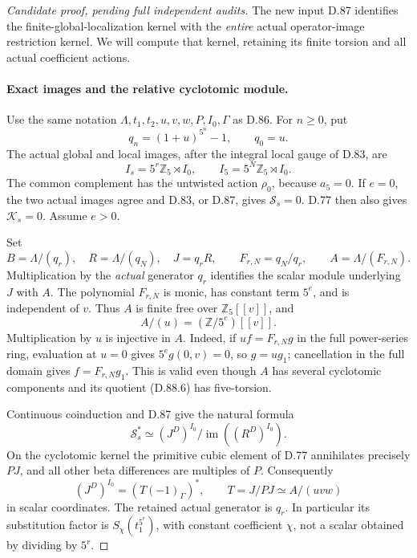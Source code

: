 \begin{proof}[Candidate proof, pending full independent audits]
The new input D.87 identifies the finite-global-localization
kernel with the \emph{entire} actual operator-image restriction
kernel. We will compute that kernel, retaining its finite
torsion and all actual coefficient actions.

\paragraph{Exact images and the relative cyclotomic module.}
Use the same notation \(\Lambda,t_1,t_2,u,v,w,P,I_0,\Gamma\)
as D.86. For \(n\ge0\), put
\[
                     q_n=(1+u)^{5^n}-1,
                     \qquad q_0=u.
\]
The actual global and local images, after the integral local
gauge of D.83, are
\[
 I_s=5^r\mathbb Z_5\rtimes I_0,
       \qquad I_5=5^N\mathbb Z_5\rtimes I_0.           \tag{D.88.4}
\]
The common complement has the untwisted action \(\rho_0\),
because \(a_5=0\). If \(e=0\), the two actual images agree
and D.83, or D.87, gives \(\mathcal S_s=0\). D.77 then
also gives \(\mathcal K_s=0\). Assume \(e>0\).

Set
\[
 B=\Lambda/(q_r),\quad R=\Lambda/(q_N),\quad J=q_rR,
 \qquad F_{r,N}=q_N/q_r,
 \qquad A=\Lambda/(F_{r,N}).                           \tag{D.88.5}
\]
Multiplication by the \emph{actual} generator \(q_r\)
identifies the scalar module underlying \(J\) with \(A\).
The polynomial \(F_{r,N}\) is monic, has constant term
\(5^e\), and is independent of \(v\). Thus \(A\) is
finite free over \(\mathbb Z_5[[v]]\), and
\[
                     A/(u)=(\mathbb Z/5^e)[[v]].       \tag{D.88.6}
\]
Multiplication by \(u\) is injective in \(A\). Indeed,
if \(uf=F_{r,N}g\) in the full power-series ring, evaluation
at \(u=0\) gives \(5^e g(0,v)=0\), so \(g=ug_1\);
cancellation in the full domain gives \(f=F_{r,N}g_1\).
This is valid even though \(A\) has several cyclotomic
components and its quotient (D.88.6) has five-torsion.

Continuous coinduction and D.87 give the natural formula
\[
 \mathcal S_s^*\simeq
       (J^D)^{I_0}/\operatorname{im}((R^D)^{I_0}).       \tag{D.88.7}
\]
On the cyclotomic kernel the primitive cubic element of D.77
annihilates precisely \(PJ\), and all other beta differences
are multiples of \(P\). Consequently
\[
 (J^D)^{I_0}=(T(-1)_\Gamma)^*,\qquad
             T=J/PJ\simeq A/(uvw)                    \tag{D.88.8}
\]
in scalar coordinates. The retained actual generator is
\(q_r\). In particular its substitution factor is
\(S_\chi(t_1^{5^r})\), with constant coefficient \(\chi\),
not a scalar obtained by dividing by \(5^r\).


\end{proof}
